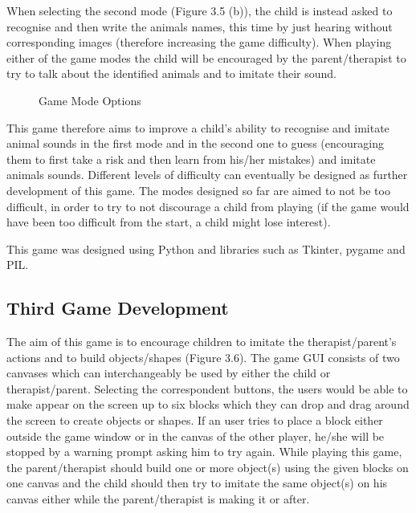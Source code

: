 When selecting the second mode (Figure 3.5 (b)), the child is instead asked to recognise and then write the animals names, this time by just hearing without corresponding images (therefore increasing the game difficulty). When playing either of the game modes the child will be encouraged by the parent/therapist to try to talk about the identified animals and to imitate their sound.

\begin{figure}[ht!]%
    \centering
    \qquad
    \caption{Game Mode Options}%
    \label{fig:example2}%
\end{figure}

This game therefore aims to improve a child's ability to recognise and imitate animal sounds in the first mode and in the second one to guess (encouraging them to first take a risk and then learn from his/her mistakes) and imitate animals sounds. Different levels of difficulty can eventually be designed as further development of this game. The modes designed so far are aimed to not be too difficult, in order to try to not discourage a child from playing (if the game would have been too difficult from the start, a child might lose interest).

This game was designed using Python and libraries such as Tkinter, pygame and PIL.

\subsection{Third Game Development}
The aim of this game is to encourage children to imitate the therapist/parent's actions and to build objects/shapes (Figure 3.6). The game GUI consists of two canvases which can interchangeably be used by either the child or therapist/parent. Selecting the correspondent buttons, the users would be able to make appear on the screen up to six blocks which they can drop and drag around the screen to create objects or shapes. If an user tries to place a block either outside the game window or in the canvas of the other player, he/she will be stopped by a warning prompt asking him to try again. While playing this game, the parent/therapist should build one or more object(s) using the given blocks on one canvas and the child should then try to imitate the same object(s) on his canvas either while the parent/therapist is making it or after. 

